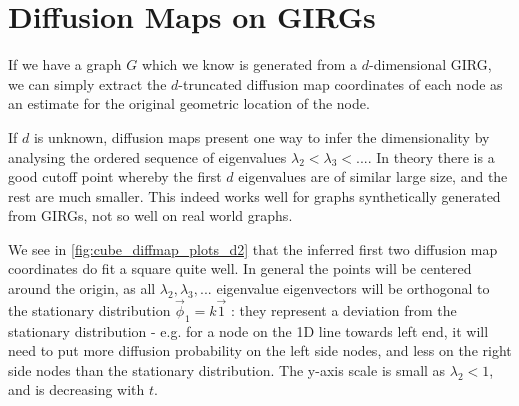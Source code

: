 



\section{Diffusion Maps on GIRGs}
If we have a graph $G$ which we know is generated from a $d$-dimensional GIRG, we can simply extract the $d$-truncated diffusion map coordinates of each node as an estimate for the original geometric location of the node.

If $d$ is unknown, diffusion maps present one way to infer the dimensionality by analysing the ordered sequence of eigenvalues $\lambda_2 < \lambda_3 < ...$. In theory there is a good cutoff point whereby the first $d$ eigenvalues are of similar large size, and the rest are much smaller. This indeed works well for graphs synthetically generated from GIRGs, not so well on real world graphs.


We see in \cref{fig:cube_diffmap_plots_d2} that the inferred first two diffusion map coordinates do fit a square quite well. In general the points will be centered around the origin, as all $\lambda_2, \lambda_3, ...$ eigenvalue eigenvectors will be orthogonal to the stationary distribution $\vec{\phi}_1 = k \vec{1}$ : they represent a deviation from the stationary distribution - e.g. for a node on the 1D line towards left end, it will need to put more diffusion probability on the left side nodes, and less on the right side nodes than the stationary distribution. The y-axis scale is small as $\lambda_2 < 1$, and is decreasing with $t$.

